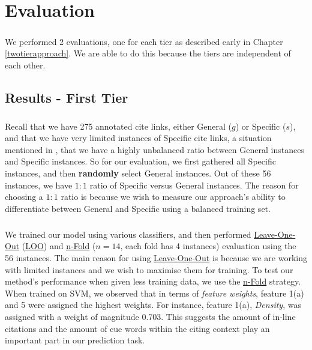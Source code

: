 \chapter{Evaluation}
\label{evaluation}
\paragraph{}
We performed 2 evaluations, one for each tier as described early in Chapter \ref{twotierapproach}. We are able to do this because the tiers are independent of each other.

\section{Results - First Tier}
\paragraph{}
Recall that we have 275 annotated cite links, either General ($g$) or Specific ($s$), and that we have very limited instances of Specific cite links, a situation mentioned in \cite{li2010negative}, that we have a highly unbalanced ratio between General instances and Specific instances. So for our evaluation, we first gathered all Specific instances, and then \textbf{randomly} select General instances. Out of these 56 instances, we have $1:1$ ratio of Specific versus General instances. The reason for choosing a $1:1$ ratio is because we wish to measure our approach's ability to differentiate between General and Specific using a balanced training set.

\paragraph{}
We trained our model using various classifiers, and then performed \url{Leave-One-Out} (\url{LOO}) and \url{n-Fold} ($n=14$, each fold has 4 instances) evaluation using the 56 instances. The main reason for using \url{Leave-One-Out} is because we are working with limited instances and we wish to maximise them for training. To test our method's performance when given less training data, we use the \url{n-Fold} strategy. When trained on SVM, we observed that in terms of \textit{feature weights}, feature 1(a) and 5 were assigned the highest weights. For instance, feature 1(a), \textit{Density}, was assigned with a weight of magnitude 0.703. This suggests the amount of in-line citations and the amount of cue words within the citing context play an important part in our prediction task.

